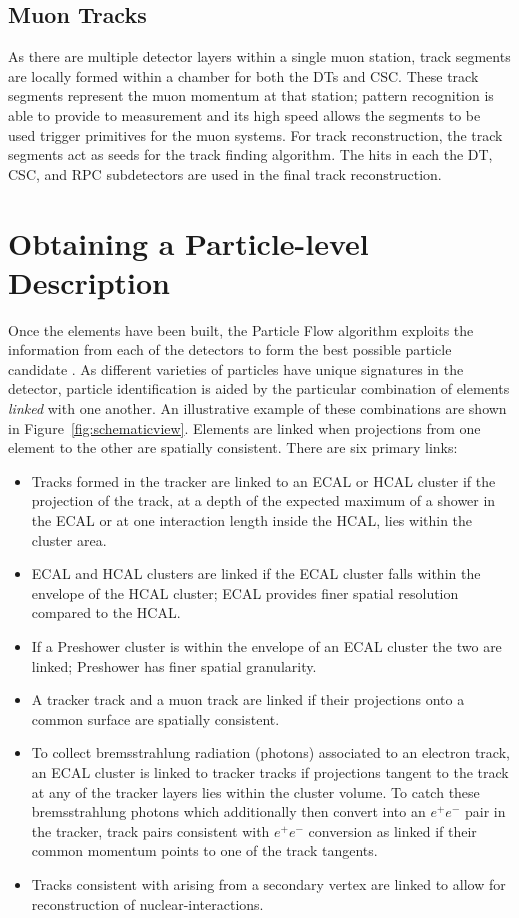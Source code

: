 \subsection{Muon Tracks}

As there are multiple detector layers within a single muon station, track segments are locally formed within a chamber for both the DTs and CSC. These track segments represent the muon momentum at that station; pattern recognition is able to provide to measurement and its high speed allows the segments to be used trigger primitives for the muon systems. For track reconstruction, the track segments act as seeds for the track finding algorithm. The hits in each the DT, CSC, and RPC subdetectors are used in the final track reconstruction.

\section{Obtaining a Particle-level Description}

Once the elements have been built, the Particle Flow algorithm exploits the information from each of the detectors to form the best possible particle candidate \cite{CMS-PRF-14-001}. As different varieties of particles have unique signatures in the detector, particle identification is aided by the particular combination of elements \textit{linked} with one another. An illustrative example of these combinations are shown in Figure~\ref{fig:schematicview}.  Elements are linked when projections from one element to the other are spatially consistent. There are six primary links:

\begin{itemize}
\item Tracks formed in the tracker are linked to an ECAL or HCAL cluster if the projection of the track, at a depth of the expected maximum of a shower in the ECAL or at one interaction length inside the HCAL, lies within the cluster area.
\item ECAL and HCAL clusters are linked if the ECAL cluster falls within the envelope of the HCAL cluster; ECAL provides finer spatial resolution compared to the HCAL.
\item If a Preshower cluster is within the envelope of an ECAL cluster the two are linked; Preshower has finer spatial granularity.
\item A tracker track and a muon track are linked if their projections onto a common surface are spatially consistent.
\item To collect bremsstrahlung radiation (photons) associated to an electron track, an ECAL cluster is linked to tracker tracks if projections tangent to the track at any of the tracker layers lies within the cluster volume. To catch these bremsstrahlung photons which additionally then convert into an $e^{+}e^{-}$ pair in the tracker, track pairs consistent with $e^{+}e^{-}$ conversion as linked if their common momentum points to one of the track tangents.
\item Tracks consistent with arising from a secondary vertex are linked to allow for reconstruction of nuclear-interactions.
\end{itemize}

